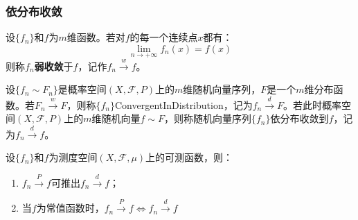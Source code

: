 \subsubsection{依分布收敛}
\begin{definition}
	设$\{f_n\}$和$f$为$m$维函数。若对$f$的每一个连续点$x$都有：
	\begin{equation*}
		\lim_{n\to+\infty}f_n(x)=f(x)
	\end{equation*}
	则称$f_n$\textbf{弱收敛}于$f$，记作$f_n\overset{w}{\longrightarrow}f$。
\end{definition}
\begin{definition}
	设$\{f_n\sim F_n\}$是概率空间$(X,\mathscr{F},P)$上的$m$维随机向量序列，$F$是一个$m$维分布函数。若$F_n\overset{w}{\longrightarrow}F$，则称$\{f_n\}$\gls{ConvergentInDistribution}，记为$f_n\overset{d}{\longrightarrow}F$。若此时概率空间$(X,\mathscr{F},P)$上的$m$维随机向量$f\sim F$，则称随机向量序列$\{f_n\}$依分布收敛到$f$，记为$f_n\overset{d}{\longrightarrow}f$。
\end{definition}
\begin{theorem}\label{theo:mu.d}
	设$\{f_n\}$和$f$为测度空间$(X,\mathscr{F},\mu)$上的可测函数，则：
	\begin{enumerate}
		\item $f_n\overset{P}{\longrightarrow}f$可推出$f_n\overset{d}{\longrightarrow}f$；
		\item 当$f$为常值函数时，$f_n\overset{P}{\longrightarrow}f\iff f_n\overset{d}{\longrightarrow}f$
	\end{enumerate}
\end{theorem}

